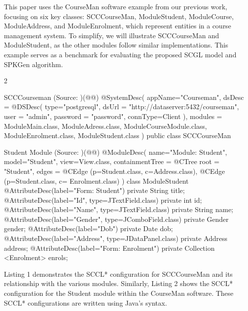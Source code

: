 \documentclass[runningheads]{llncs}
\begin{document}
This paper uses the CourseMan software example from our previous work, focusing on six key classes: SCCCourseMan, ModuleStudent, ModuleCourse, ModuleAddress, and ModuleEnrolment, which represent entities in a course management system. To simplify, we will illustrate SCCCourseMan and ModuleStudent, as the other modules follow similar implementations. This example serves as a benchmark for evaluating the proposed SCGL model and SPKGen algorithm.

\begin{multicols}{2}
\begin{lstcodessm}{SCCCourseman (Source: \cite{le_generating_2022})}(@@)
@SystemDesc(
    appName="Courseman",
    dsDesc = @DSDesc(
        type="postgresql",
        dsUrl = "http://dataserver:5432/courseman",
        user = "admin", 
        password = "password",
        connType=Client
    ),
    modules = { 
        ModuleMain.class, 
        ModuleAdress.class, 
        ModuleCourseModule.class, 
        ModuleEnrolment.class, 
        ModuleStudent.class 
    }
)
public class SCCCourseMan { }
\end{lstcodessm}

\begin{lstcodessm}{Student Module (Source: \cite{le_generating_2022})}(@@)
@ModuleDesc( name="Module: Student", 
    model="Student", view=View.class, 
    containmentTree = @CTree { 
      root = "Student", 
      edges = { 
        @CEdge (p=Student.class, c=Address.class), 
        @CEdge (p=Student.class, c= Enrolment.class) 
    }})  
class ModuleStudent { 
    @AttributeDesc(label="Form: Student") 
    private String title; 
    @AttributeDesc(label="Id", type=JTextField.class) 
    private int id; 
    @AttributeDesc(label="Name", type=JTextField.class) 
    private String name; 
    @AttributeDesc(label="Gender", 
    type=JComboField.class) 
    private Gender gender; 
    @AttributeDesc(label="Dob") 
    private Date dob; 
    @AttributeDesc(label="Address", type=JDataPanel.class) 
    private Address address; 
    @AttributeDesc(label="Form: Enrolment") 
    private Collection <Enrolment> enrols; 
}
\end{lstcodessm}
\end{multicols}

Listing 1 demonstrates the SCCL* configuration for SCCCourseMan and its relationship with the various modules. Similarly, Listing 2 shows the SCCL* configuration for the Student module within the CourseMan software. These SCCL* configurations are written using Java's syntax.
\end{document}
